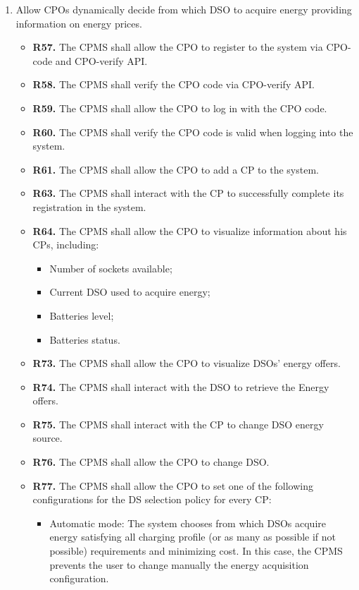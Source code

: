 \documentclass{Configuration_Files/PoliMi3i_thesis}
\begin{document}
\begin{enumerate}[label=\textbf{G\arabic*}]
    \item Allow CPOs dynamically decide from which DSO to acquire energy providing information on energy prices.
        \begin{itemize}
            \item \textbf{R57.} The CPMS shall allow the CPO to register to the system via CPO-code and CPO-verify API.
            \item \textbf{R58.} The CPMS shall verify the CPO code via CPO-verify API.
            \item \textbf{R59.} The CPMS shall allow the CPO to log in with the CPO code.
            \item \textbf{R60.} The CPMS shall verify the CPO code is valid when logging into the system.
            \item \textbf{R61.} The CPMS shall allow the CPO to add a CP to the system.
            \item \textbf{R63.} The CPMS shall interact with the CP to successfully complete its registration in the system.
            \item \textbf{R64.} The CPMS shall allow the CPO to visualize information about his CPs, including:
                \begin{itemize}
                    \item Number of sockets available;
                    \item Current DSO used to acquire energy;
                    \item Batteries level;
                    \item Batteries status.
                \end{itemize}
            \item \textbf{R73.} The CPMS shall allow the CPO to visualize DSOs' energy offers.
            \item \textbf{R74.} The CPMS shall interact with the DSO to retrieve the Energy offers.
            \item \textbf{R75.} The CPMS shall interact with the CP to change DSO energy source.
            \item \textbf{R76.} The CPMS shall allow the CPO to change DSO.
            \item \textbf{R77.} The CPMS shall allow the CPO to set one of the following configurations for the DS selection policy for every CP:
                \begin{itemize}
                    \item Automatic mode: The system chooses from which DSOs acquire energy satisfying all charging profile (or as many as possible if not possible) requirements and minimizing cost. In this case, the CPMS prevents the user to change manually the energy acquisition configuration.

\end{itemize}
\end{itemize}
\end{enumerate}
\end{document}
